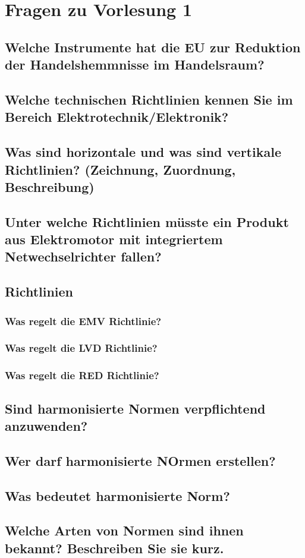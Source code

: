\section{Fragen zu Vorlesung 1}
\subsection{Welche Instrumente hat die EU zur Reduktion der Handelshemmnisse im Handelsraum?}
\subsection{Welche technischen Richtlinien kennen Sie im Bereich Elektrotechnik/Elektronik?}
\subsection{Was sind horizontale und was sind vertikale Richtlinien? (Zeichnung, Zuordnung, Beschreibung)}
\subsection{Unter welche Richtlinien müsste ein Produkt aus Elektromotor mit integriertem Netwechselrichter fallen?}
\subsection{Richtlinien}
\subsubsection{Was regelt die EMV Richtlinie?}
\subsubsection{Was regelt die LVD Richtlinie?}
\subsubsection{Was regelt die RED Richtlinie?}
\subsection{Sind harmonisierte Normen verpflichtend anzuwenden?}
\subsection{Wer darf harmonisierte NOrmen erstellen?}
\subsection{Was bedeutet harmonisierte Norm?}
\subsection{Welche Arten von Normen sind ihnen bekannt? Beschreiben Sie sie kurz.}

\pagebreak